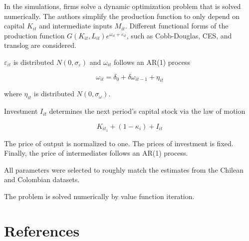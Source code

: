 \documentclass[
]{article}
\begin{document}
In the simulations, firms solve a dynamic optimization problem that is
solved numerically. The authors simplify the production function to only
depend on capital \(K_{it}\) and intermediate inputs \(M_{it}\).
Different functional forms of the production function
\(G(K_{it},L_{it})e^{\omega_{it}+\varepsilon_{it}}\), such as
Cobb-Douglas, CES, and translog are considered.

\(\varepsilon_{it}\) is distributed \(N(0,\sigma_\varepsilon)\) and
\(\omega_{it}\) follows an AR(1) process

\[
\omega_{it}=\delta_0+\delta\omega_{it-1}+\eta_{it}
\]

where \(\eta_{it}\) is distributed \(N(0,\sigma_\omega)\).

Investment \(I_{it}\) determines the next period's capital stock via the
law of motion

\[
K_{it_1}+(1-\kappa_i)+I_{it}
\]

The price of output is normalized to one. The prices of investment is
fixed. Finally, the price of intermediates follows an AR(1) process.

All parameters were selected to roughly match the estimates from the
Chilean and Colombian datasets.

The problem is solved numerically by value function iteration.

\hypertarget{references}{%
\section*{References}\label{references}}
\end{document}

